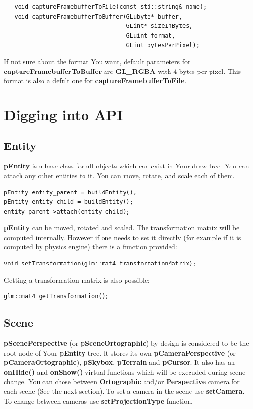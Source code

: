 \documentclass{article}
\begin{document}
\begin{lstlisting}
   void captureFramebufferToFile(const std::string& name);
   void captureFramebufferToBuffer(GLubyte* buffer,
                                   GLint* sizeInBytes,
                                   GLuint format,
                                   GLint bytesPerPixel);
\end{lstlisting}
\indent \indent If not sure about the format You want, default parameters for \textbf{captureFramebufferToBuffer} are \textbf{GL\_RGBA} with 4 bytes per pixel. This format is also a defult one for \textbf{captureFramebufferToFile}.

\section{Digging into API}

\subsection{Entity}\label{sec:Entity}
\indent \indent \textbf{pEntity} is a base class for all objects which can exist in Your draw tree. You can attach any other entities to it. You can move, rotate, and scale each of them.

\begin{lstlisting}
pEntity entity_parent = buildEntity();
pEntity entity_child = buildEntity();
entity_parent->attach(entity_child);
\end{lstlisting}

\indent \indent \textbf{pEntity} can be moved, rotated and scaled. The transformation matrix will be computed internally. However if one needs to set it directly (for example if it is computed by physics engine) there is a function provided:

\begin{lstlisting}
void setTransformation(glm::mat4 transformationMatrix);
\end{lstlisting}

\indent \indent Getting a transformation matrix is also possible:

\begin{lstlisting}
glm::mat4 getTransformation();
\end{lstlisting}

\subsection{Scene}\label{sec:Scene}
\indent \indent \textbf{pScenePerspective} (or \textbf{pSceneOrtographic}) by design is considered to be the root node of Your \textbf{pEntity} tree. It stores its own \textbf{pCameraPerspective} (or \textbf{pCameraOrtographic}), \textbf{pSkybox}, \textbf{pTerrain} and \textbf{pCursor}. It also has an \textbf{onHide()} and \textbf{onShow()} virtual functions which will be execuded during scene change. You can chose between \textbf{Ortographic} and/or \textbf{Perspective} camera for each scene (See the next section). To set a camera in the scene use \textbf{setCamera}. To change between cameras use \textbf{setProjectionType} function.
\end{document}
